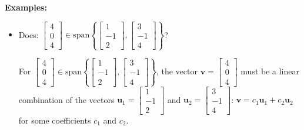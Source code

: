 \documentclass{article}
\begin{document}
\textbf{Examples:}
\begin{itemize}
\item Does: \(\begin{bmatrix} 4 \\ 0 \\ 4 \end{bmatrix} \in \text{span}\left\{\begin{bmatrix} 1 \\ -1 \\ 2 \end{bmatrix}, \begin{bmatrix} 3 \\ -1 \\ 4 \end{bmatrix}\right\}\)?  

For \(\begin{bmatrix} 4 \\ 0 \\ 4 \end{bmatrix} \in \text{span}\left\{\begin{bmatrix} 1 \\ -1 \\ 2 \end{bmatrix}, \begin{bmatrix} 3 \\ -1 \\ 4 \end{bmatrix}\right\}\), the vector \(\mathbf{v} = \begin{bmatrix} 4 \\ 0 \\ 4 \end{bmatrix}\) must be a linear combination of the vectors \(\mathbf{u}_1 = \begin{bmatrix} 1 \\ -1 \\ 2 \end{bmatrix}\) and \(\mathbf{u}_2 = \begin{bmatrix} 3 \\ -1 \\ 4 \end{bmatrix}\): \(\mathbf{v} = c_1\mathbf{u}_1 + c_2\mathbf{u}_2\) for some coefficients \(c_1\) and \(c_2\).


\end{itemize}
\end{document}
